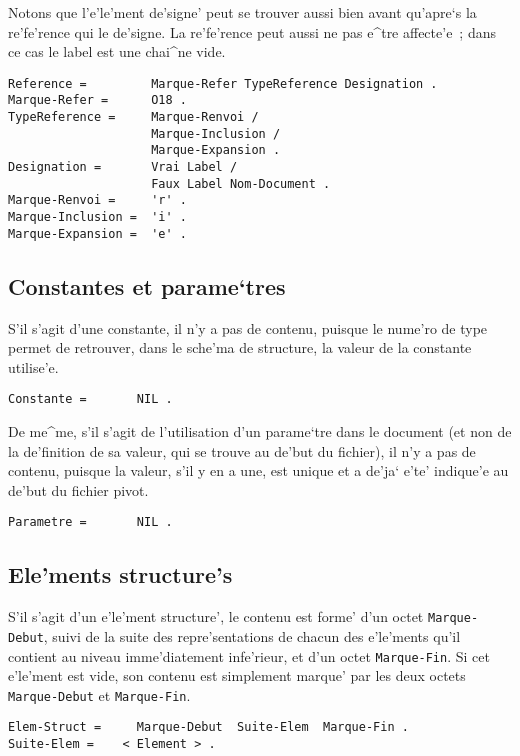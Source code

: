 Notons que l'e'le'ment de'signe' peut se trouver aussi bien avant qu'apre`s
la re'fe'rence qui le de'signe. La re'fe'rence peut aussi ne pas e^tre
affecte'e~; dans ce cas le label est une chai^ne vide.

\begin{verbatim}
Reference =         Marque-Refer TypeReference Designation .
Marque-Refer =      O18 .
TypeReference =     Marque-Renvoi /
                    Marque-Inclusion /
                    Marque-Expansion .
Designation =       Vrai Label /
                    Faux Label Nom-Document .
Marque-Renvoi =     'r' .
Marque-Inclusion =  'i' .
Marque-Expansion =  'e' .
\end{verbatim}

\subsection{Constantes et parame`tres}

S'il s'agit d'une constante, il n'y a pas de contenu, puisque
le nume'ro de type permet de retrouver, dans le sche'ma de structure, la
valeur de la constante utilise'e.

\begin{verbatim}
Constante =       NIL .
\end{verbatim}

De me^me, s'il s'agit de l'utilisation d'un parame`tre dans le document
(et non de la de'finition de sa valeur, qui se trouve au de'but du fichier),
il n'y a pas de contenu, puisque la valeur, s'il y en a une, est unique et
a de'ja` e'te' indique'e au de'but du fichier pivot.

\begin{verbatim}
Parametre =       NIL .
\end{verbatim}

\subsection{Ele'ments structure's}

S'il s'agit d'un e'le'ment structure', le contenu est forme' d'un octet
{\tt Marque-Debut}, suivi de la suite des repre'sentations de chacun des
e'le'ments qu'il contient au niveau imme'diatement infe'rieur, et d'un
octet {\tt Marque-Fin}. Si cet e'le'ment est vide, son contenu est simplement
marque' par les deux octets {\tt Marque-Debut} et {\tt Marque-Fin}.

\begin{verbatim}
Elem-Struct =     Marque-Debut  Suite-Elem  Marque-Fin .
Suite-Elem =    < Element > .
\end{verbatim}

